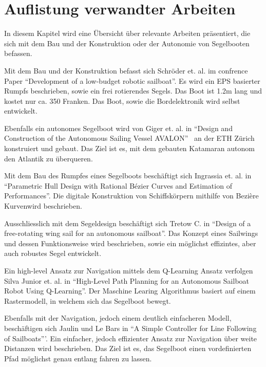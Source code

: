

\chapter{Auflistung verwandter Arbeiten}
\label{chap:literaturübersicht}

In diesem Kapitel wird eine Übersicht über relevante Arbeiten präsentiert, die sich mit dem Bau und der Konstruktion oder der Autonomie von Segelbooten befassen.

Mit dem Bau und der Konstruktion befasst sich Schröder et. al. im confrence Paper \enquote{Development of a low-budget robotic sailboat}. Es wird ein EPS basierter Rumpfs beschrieben, sowie ein frei rotierendes Segels. Das Boot ist 1.2m lang und kostet nur ca. 350 Franken. Das Boot, sowie die Bordelektronik wird selbst entwickelt. \cite{10.1007/978-3-319-02276-5_2}
 
Ebenfalls ein autonomes Segelboot wird von Giger et. al. in \enquote{Design and Construction of the Autonomous Sailing Vessel AVALON} \ an der ETH Zürich konstruiert und gebaut. Das Ziel ist es, mit dem gebauten Katamaran autonom den Atlantik zu überqueren. \cite{giger_design_2009}

Mit dem Bau des Rumpfes eines Segelboots beschäftigt sich Ingrassia et. al. in \enquote{Parametric Hull Design with Rational Bézier Curves and Estimation of Performances}. Die digitale Konstruktion von Schiffskörpern  mithilfe von Bezière Kurvenwird  beschrieben. \cite{ingrassia_parametric_2021}

Ausschliesslich mit dem Segeldesign beschäftigt sich Tretow C. in \enquote{Design of a free-rotating wing sail for an autonomous sailboat}. Das Konzept eines Sailwings und dessen Funktionsweise wird beschrieben, sowie ein möglichst effizintes, aber auch robustes Segel entwickelt. \cite{Tretow2017DesignOA}

Ein high-level Ansatz zur Navigation mittels dem Q-Learning Ansatz verfolgen Silva Junior et. al. in \enquote{High-Level Path Planning for an Autonomous Sailboat Robot Using Q-Learning}. Der Maschine Learing Algorithmus basiert auf einem Rastermodell, in welchem sich das Segelboot bewegt. \cite{silva_junior_high-level_2020}

Ebenfalls mit der Navigation, jedoch einem deutlich einfacheren Modell, beschäftigen sich Jaulin und Le Bars in \enquote{{}A{} Simple Controller for Line Following of Sailboats}'. Ein einfacher, jedoch effizienter Ansatz zur Navigation über weite Distanzen wird beschrieben. Das Ziel ist es, das Segelboot einen vordefinierten Pfad möglichst genau entlang fahren zu lassen. \cite{sauze_simple_2013}

